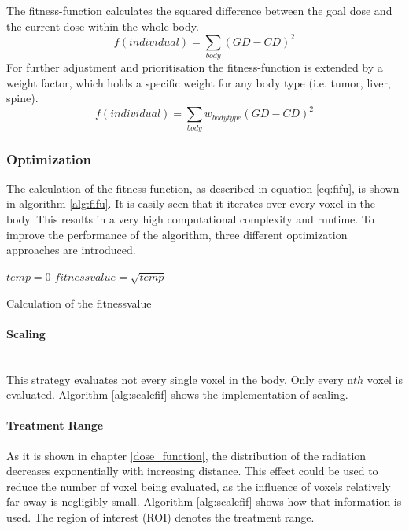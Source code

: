 \documentclass[12pt]{article}
\begin{document}
 The fitness-function calculates the squared difference between the goal dose and the current dose within the whole body.
 \begin{equation}
 f(individual) = \sum_{body}(GD-CD)^2
 \end{equation}
 For further adjustment and prioritisation the fitness-function is extended by a weight factor, which holds a specific weight for any body type (i.e. tumor, liver, spine).
 \begin{equation}
 \label{eq:fifu}
 f(individual) = \sum_{body}w_{bodytype}(GD-CD)^2
 \end{equation}

\subsubsection{Optimization}
\label{subsubsec:optimization}
The calculation of the fitness-function, as described in equation \eqref{eq:fifu}, is shown in algorithm \ref{alg:fifu}. It is easily seen that it iterates over every voxel in the body. This results in a very high computational complexity and runtime. To improve the performance of the algorithm, three different optimization approaches are introduced. \\

\begin{algorithm}[H]
\label{alg:fifu}
 $temp=0$\;
 $fitnessvalue = \sqrt{temp}$\;
 \;
 \caption{Calculation of the fitnessvalue}
 
 \end{algorithm}


\paragraph{Scaling}
\label{para:scaling}
~\\
This strategy evaluates not every single voxel in the body. Only every n$th$ voxel is evaluated. Algorithm \ref{alg:scalefif} shows the implementation of scaling. \\

\paragraph{Treatment Range}
\label{para:treatment range}
As it is shown in chapter \ref{dose_function}, the distribution of the radiation decreases exponentially with increasing distance. This effect could be used to reduce the number of voxel being evaluated, as the influence of voxels relatively far away is negligibly small. Algorithm \ref{alg:scalefif} shows how that information is used. The region of interest (ROI) denotes the treatment range. \\
\end{document}
